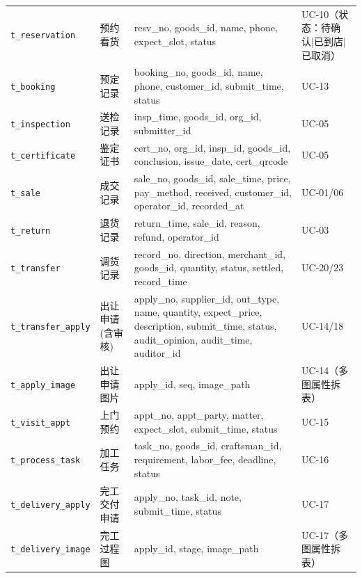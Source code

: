 \documentclass[12pt, a4paper]{ctexart}
\newcommand{\code}[1]{\texttt{\small #1}}
\begin{document}
\begin{longtable}{@{}p{3.3cm} p{1.9cm} p{5.7cm} p{2.3cm}@{}}
\code{t\_reservation} & 预约看货 & resv\_no, goods\_id, name, phone, expect\_slot, status & UC-10（状态：待确认|已到店|已取消）\\
\code{t\_booking} & 预定记录 & booking\_no, goods\_id, name, phone, customer\_id, submit\_time, status & UC-13 \\
\code{t\_inspection} & 送检记录 & insp\_time, goods\_id, org\_id, submitter\_id & UC-05 \\
\code{t\_certificate} & 鉴定证书 & cert\_no, org\_id, insp\_id, goods\_id, conclusion, issue\_date, cert\_qrcode & UC-05 \\
\code{t\_sale} & 成交记录 & sale\_no, goods\_id, sale\_time, price, pay\_method, received, customer\_id, operator\_id, recorded\_at & UC-01/06 \\
\code{t\_return} & 退货记录 & return\_time, sale\_id, reason, refund, operator\_id & UC-03 \\
\code{t\_transfer} & 调货记录 & record\_no, direction, merchant\_id, goods\_id, quantity, status, settled, record\_time & UC-20/23 \\
\code{t\_transfer\_apply} & 出让申请(含审核) & apply\_no, supplier\_id, out\_type, name, quantity, expect\_price, description, submit\_time, status, audit\_opinion, audit\_time, auditor\_id & UC-14/18 \\
\code{t\_apply\_image} & 出让申请图片 & apply\_id, seq, image\_path & UC-14（多图属性拆表）\\

\code{t\_visit\_appt} & 上门预约 & appt\_no, appt\_party, matter, expect\_slot, submit\_time, status & UC-15 \\
\code{t\_process\_task} & 加工任务 & task\_no, goods\_id, craftsman\_id, requirement, labor\_fee, deadline, status & UC-16 \\
\code{t\_delivery\_apply} & 完工交付申请 & apply\_no, task\_id, note, submit\_time, status & UC-17 \\
\code{t\_delivery\_image} & 完工过程图 & apply\_id, stage, image\_path & UC-17（多图属性拆表）\\


\end{longtable}
\end{document}
